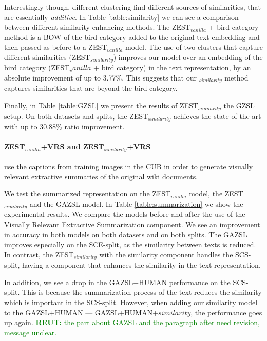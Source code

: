 \documentclass[11pt,a4paper]{article}
\newcommand\reut[1]{\textcolor{green}{\textbf{REUT:} #1 }}
\begin{document}
Interestingly though, different clustering find different sources of similarities, that are essentially {\em additive}. In Table \ref{table:similarity} we can see a comparison between different similarity enhancing methods. 
The ZEST$_{vanilla}$ + bird category method is a BOW of the bird category added to the original text embedding and then passed as before to a ZEST$_{vanilla}$ model. 
The use of two clusters that capture different similarities (ZEST$_{similarity}$) improves our model over an embedding of the bird category (ZEST$_vanilla$ + bird category) in the text representation, by an absolute improvement of up to 3.77\%. This suggests that our $_{similarity}$ method captures similarities that are beyond the bird category. %

Finally, 
in Table \ref{table:GZSL} we present the results of ZEST$_{similarity}$  the GZSL setup. On both datasets and splits, the ZEST$_{similarity}$ achieves the state-of-the-art with up to 30.88\% ratio improvement.

\paragraph{ ZEST$_{vanilla}$+VRS and ZEST$_{similarity}$+VRS }
use the captions from training images in the CUB in order to generate visually relevant extractive summaries of the original wiki documents.

We test the summarized representation on the ZEST$_{vanilla}$ model, the ZEST$_{similarity}$ and the GAZSL \citep{zhu2018generative} model. In Table \ref{table:summarization} we show the experimental results. We compare the models before and after the use of the Visually Relevant  Extractive Summarization component. We see an improvement in accuracy in both models on both datasets and on both splits. The GAZSL improves especially on the SCE-split, as the similarity between texts is reduced. In contrast, the ZEST$_{similarity}$ with the similarity component handles the SCS-split, having a component that enhances the similarity in the text representation.  

In addition, we see a drop in the GAZSL+HUMAN performance on the SCS-split. This is because the summarization process of the text reduces the similarity which is important in the SCS-split. However, when adding our similarity model to the GAZSL+HUMAN --- GAZSL+HUMAN+$similarity$,  the performance goes up again.
\reut{the part about GAZSL and the  paragraph after need revision, message unclear.} 
\end{document}
